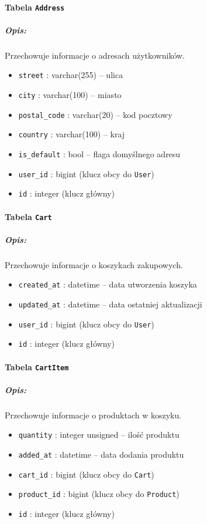 \documentclass[12pt,a4paper,oneside]{article}
\theoremstyle{definition}
\numberwithin{equation}{section}
\begin{document}
\paragraph{Tabela \texttt{Address}}
\subparagraph{Opis:} Przechowuje informacje o adresach użytkowników.
    \begin{itemize}
        \item \texttt{street} : varchar(255) – ulica
        \item \texttt{city} : varchar(100) – miasto
        \item \texttt{postal\string_code} : varchar(20) – kod pocztowy
        \item \texttt{country} : varchar(100) – kraj
        \item \texttt{is\string_default} : bool – flaga domyślnego adresu
        \item \texttt{user\string_id} : bigint (klucz obcy do \texttt{User})
        \item \texttt{id} : integer (klucz główny)
    \end{itemize}

\paragraph{Tabela \texttt{Cart}}
\subparagraph{Opis:} Przechowuje informacje o koszykach zakupowych.
\begin{itemize}
    \item \texttt{created\string_at} : datetime – data utworzenia koszyka
    \item \texttt{updated\string_at} : datetime – data ostatniej aktualizacji
    \item \texttt{user\string_id} : bigint (klucz obcy do \texttt{User})
    \item \texttt{id} : integer (klucz główny)
\end{itemize}

\paragraph{Tabela \texttt{CartItem}}
\subparagraph{Opis:} Przechowuje informacje o produktach w koszyku.
\begin{itemize}
    \item \texttt{quantity} : integer unsigned – ilość produktu
    \item \texttt{added\string_at} : datetime – data dodania produktu
    \item \texttt{cart\string_id} : bigint (klucz obcy do \texttt{Cart})
    \item \texttt{product\string_id} : bigint (klucz obcy do \texttt{Product})
    \item \texttt{id} : integer (klucz główny)
\end{itemize}
\end{document}
